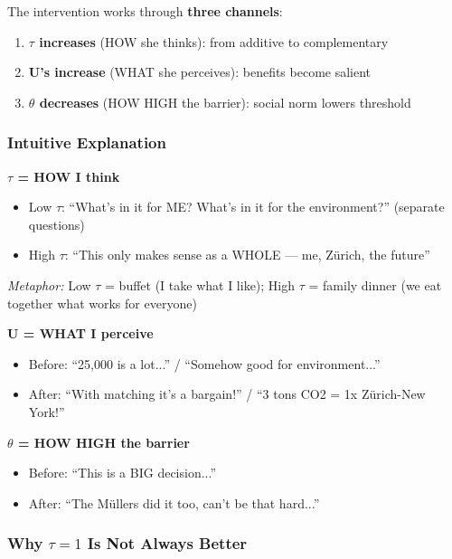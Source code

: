 The intervention works through \textbf{three channels}:
\begin{enumerate}
\item \textbf{$\tau$ increases} (HOW she thinks): from additive to complementary
\item \textbf{U's increase} (WHAT she perceives): benefits become salient
\item \textbf{$\theta$ decreases} (HOW HIGH the barrier): social norm lowers threshold
\end{enumerate}

\subsubsection{Intuitive Explanation}

\begin{tcolorbox}[colback=blue!5!white,colframe=blue!75!black,title=The Three Levers --- Intuitive]
\textbf{$\tau$ = HOW I think}
\begin{itemize}
\item Low $\tau$: ``What's in it for ME? What's in it for the environment?'' (separate questions)
\item High $\tau$: ``This only makes sense as a WHOLE --- me, Zürich, the future''
\end{itemize}
\textit{Metaphor:} Low $\tau$ = buffet (I take what I like); High $\tau$ = family dinner (we eat together what works for everyone)

\textbf{U = WHAT I perceive}
\begin{itemize}
\item Before: ``25,000 is a lot...'' / ``Somehow good for environment...''
\item After: ``With matching it's a bargain!'' / ``3 tons CO2 = 1x Zürich-New York!''
\end{itemize}

\textbf{$\theta$ = HOW HIGH the barrier}
\begin{itemize}
\item Before: ``This is a BIG decision...''
\item After: ``The Müllers did it too, can't be that hard...''
\end{itemize}
\end{tcolorbox}

\subsubsection{Why $\tau = 1$ Is Not Always Better}

